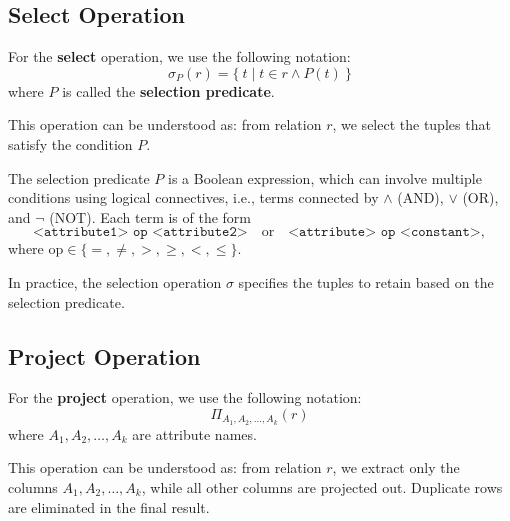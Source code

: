 \subsection{Select Operation}
For the \textbf{select} operation, we use the following notation: 
\[
  \sigma_P(r) = \{\ t \mid t \in r \land P(t) \ \}
\] 
where \(P\) is called the \textbf{selection predicate}. 

This operation can be understood as: from relation \(r\), we select the tuples that satisfy the condition \(P\). 

The selection predicate \(P\) is a Boolean expression, which can involve multiple conditions using logical connectives, i.e., terms connected by \(\land\) (AND), \(\lor\) (OR), and \(\lnot\) (NOT). Each term is of the form 
\[
  \texttt{<attribute1> op <attribute2>} \quad \text{or} \quad \texttt{<attribute> op <constant>},
\]  
where \(\text{op} \in \{=, \neq, >, \geq, <, \leq\}\). 

In practice, the selection operation \(\sigma\) specifies the tuples to retain based on the selection predicate.

\subsection{Project Operation}
For the \textbf{project} operation, we use the following notation: 
\[
  \Pi_{A_1, A_2, \dots, A_k}(r)
\]
where \(A_1, A_2, \dots, A_k\) are attribute names. 

This operation can be understood as: from relation \(r\), we extract only the columns \(A_1, A_2, \dots, A_k\), while all other columns are projected out. Duplicate rows are eliminated in the final result. 


